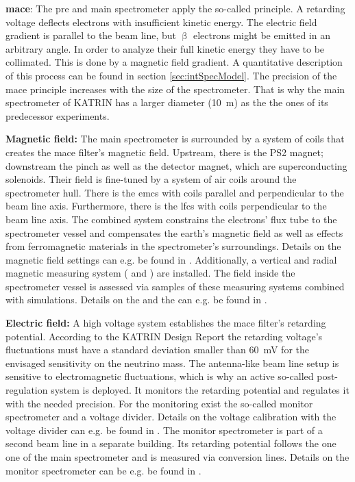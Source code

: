     {\par \textbf{\Gls{mace}}: The pre and main spectrometer apply the so-called  principle. A retarding voltage deflects electrons with insufficient kinetic energy. The electric field gradient is parallel to the beam line, but $\upbeta$ electrons might be emitted in an arbitrary angle. In order to analyze their full kinetic energy they have to be collimated. This is done by a magnetic field gradient. A quantitative description of this process can be found in section \ref{sec:intSpecModel}. The precision of the \gls{mace} principle increases with the size of the spectrometer. That is why the main spectrometer of KATRIN has a larger diameter (\SI{10}{m}) as the the ones of its predecessor experiments.
    }
    
    {\par \textbf{Magnetic field:} The main spectrometer is surrounded by a system of coils that creates the \gls{mace} filter's  magnetic field. Upstream, there is the PS2 magnet; downstream the pinch as well as the detector magnet, which are superconducting solenoids. Their field is fine-tuned by a system of air coils around the spectrometer hull. There is the \gls{emcs} with coils parallel and perpendicular to the beam line axis. Furthermore, there is the \gls{lfcs} with coils perpendicular to the beam line axis. The combined system constrains the electrons' flux tube to the spectrometer vessel and compensates the earth's magnetic field as well as effects from ferromagnetic materials in the spectrometer's surroundings. Details on the magnetic field settings can e.g. be found in \cite{Erhard2018}. Additionally, a vertical and radial magnetic measuring system ( and ) are installed. The field inside the spectrometer vessel is assessed via samples of these measuring systems combined with simulations. Details on the  and the  can e.g. be found in \cite{Letnev2018}.}
    
    {\par \textbf{Electric field:} A high voltage system establishes the \gls{mace} filter's retarding potential. According to the KATRIN Design Report \cite{Angrik:2005ep} the retarding voltage's fluctuations must have a standard deviation smaller than \SI{60}{mV} for the envisaged sensitivity on the neutrino mass. The antenna-like beam line setup is sensitive to electromagnetic fluctuations, which is why an active so-called post-regulation system is deployed. It monitors the retarding potential and regulates it with the needed precision. For the monitoring exist the so-called monitor spectrometer and a voltage divider. Details on the voltage calibration with the voltage divider can e.g. be found in \cite{Thuemmler2009}. The monitor spectrometer is part of a second beam line in a separate building. Its retarding potential follows the one one of the main spectrometer and is measured via \kryptonEightyThree{} conversion lines. Details on the monitor spectrometer can be e.g. be found in \cite{Erhard2014}.}
    
